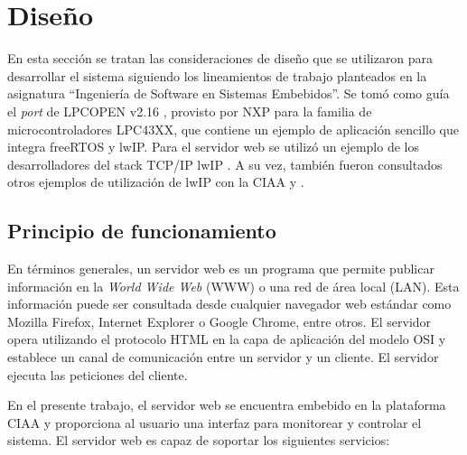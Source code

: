 \section{Diseño}

En esta sección se tratan las consideraciones de diseño que se utilizaron para desarrollar el sistema siguiendo los lineamientos de trabajo planteados en la asignatura “Ingeniería de Software en Sistemas Embebidos”.  Se tomó como guía el \textit{port} de LPCOPEN v2.16 \citep{lpcopen}, provisto por NXP para la familia de microcontroladores LPC43XX, que contiene un ejemplo de aplicación sencillo que integra \mbox{freeRTOS} y lwIP.  Para el servidor web se utilizó un ejemplo de los desarrolladores del stack TCP/IP lwIP \citep{contrib}. A su vez, también fueron consultados otros ejemplos de utilización de lwIP con la CIAA \citep{ws-ridolfi} y \citep{ciaaFirmware}.

\subsection{Principio de funcionamiento}

En términos generales, un servidor web es un programa que permite publicar información en la \textit{World Wide Web} (WWW) o una red de área local (LAN). Esta información puede ser consultada desde cualquier navegador web estándar como Mozilla Firefox, Internet Explorer o Google Chrome, entre otros. El servidor opera utilizando el protocolo HTML \citep{rfc7540} en la capa de aplicación del modelo OSI \citep{OSI} y establece un canal de comunicación entre un servidor y un cliente. El servidor ejecuta las peticiones del cliente. 

En el presente trabajo, el servidor web se encuentra embebido en la plataforma CIAA y proporciona al usuario una interfaz para monitorear y controlar el sistema. El servidor web es capaz de soportar los siguientes servicios:

